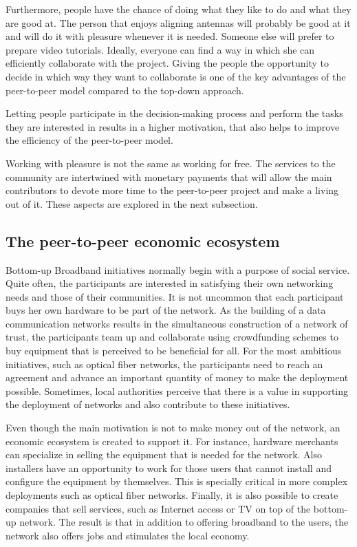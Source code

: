 \documentclass[journal]{IEEEtran}
\begin{document}
Furthermore, people have the chance of doing what they like to do and what they are good at.
The person that enjoys aligning antennas will probably be good at it and will do it with pleasure whenever it is needed.
Someone else will prefer to prepare video tutorials.
Ideally, everyone can find a way in which she can efficiently collaborate with the project.
Giving the people the opportunity to decide in which way they want to collaborate is one of the key advantages of the peer-to-peer model compared to the top-down approach.


Letting people participate in the decision-making process and perform the tasks they are interested in results in a higher motivation, that also helps to improve the efficiency of the peer-to-peer model.

Working with pleasure is not the same as working for free.
The services to the community are intertwined with monetary payments that will allow the main contributors to devote more time to the peer-to-peer project and make a living out of it.
These aspects are explored in the next subsection.

\subsection{The peer-to-peer economic ecosystem}

Bottom-up Broadband initiatives normally begin with a purpose of social service.
Quite often, the participants are interested in satisfying their own networking needs and those of their communities.
It is not uncommon that each participant buys her own hardware to be part of the network.
As the building of a data communication networks results in the simultaneous construction of a network of trust, the participants team up and collaborate using crowdfunding schemes to buy equipment that is perceived to be beneficial for all.
For the most ambitious initiatives, such as optical fiber networks, the participants need to reach an agreement and advance an important quantity of money to make the deployment possible.
Sometimes, local authorities perceive that there is a value in supporting the deployment of networks and also contribute to these initiatives.

Even though the main motivation is not to make money out of the network, an economic ecosystem is created to support it.
For instance, hardware merchants can specialize in selling the equipment that is needed for the network.
Also installers have an opportunity to work for those users that cannot install and configure the equipment by themselves.
This is specially critical in more complex deployments such as optical fiber networks.
Finally, it is also possible to create companies that sell services, such as Internet access or TV on top of the bottom-up network.
The result is that in addition to offering broadband to the users, the network also offers jobs and stimulates the local economy.
\end{document}
